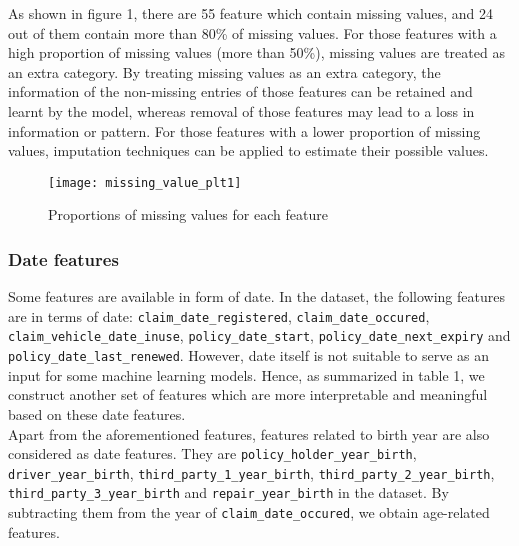 \documentclass[12pt]{article}
\begin{document}
As shown in figure 1, there are 55 feature which contain missing values, and 24 out of them contain more than 80\% of missing values. For those features with a high proportion of missing values (more than 50\%), missing values are treated as an extra category. By treating missing values as an extra category, the information of the non-missing entries of those features can be retained and learnt by the model, whereas removal of those features may lead to a loss in information or pattern. For those features with a lower proportion of missing values, imputation techniques can be applied to estimate their possible values.

\begin{figure}[h]
\centering
\texttt{[image: missing\_value\_plt1]}
\caption{Proportions of missing values for each feature}
\end{figure}

\clearpage

\subsubsection*{Date features}

Some features are available in form of date. In the dataset, the following features are in terms of date: \texttt{claim\_date\_registered}, \texttt{claim\_date\_occured}, \texttt{claim\_vehicle\_date\_inuse}, \texttt{policy\_date\_start}, \texttt{policy\_date\_next\_expiry} and \texttt{policy\_date\_last\_renewed}. However, date itself is not suitable to serve as an input for some machine learning models. Hence, as summarized in table 1, we construct another set of features which are more interpretable and meaningful based on these date features.\\

Apart from the aforementioned features, features related to birth year are also considered as date features. They are \texttt{policy\_holder\_year\_birth}, \texttt{driver\_year\_birth}, \texttt{third\_party\_1\_year\_birth}, \texttt{third\_party\_2\_year\_birth}, \texttt{third\_party\_3\_year\_birth} and \texttt{repair\_year\_birth} in the dataset. By subtracting them from the year of \texttt{claim\_date\_occured}, we obtain age-related features.
\end{document}

